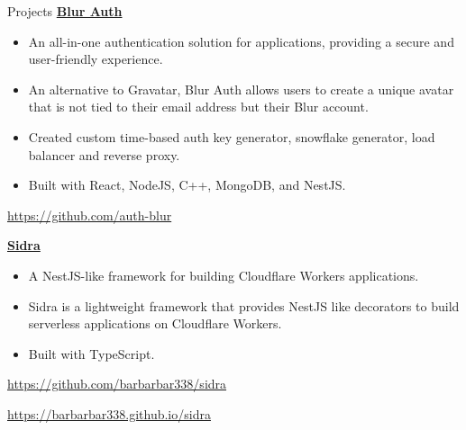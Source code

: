 \begin{rubric}{Projects}
    \entry*[2020]%
        \href{https://github.com/auth-blur}{\textbf{Blur Auth}}
        \begin{itemize}
            \item An all-in-one authentication solution for applications, providing a secure and user-friendly experience.
            \item An alternative to Gravatar, Blur Auth allows users to create a unique avatar that is not tied to their email address but their Blur account.
            \item Created custom time-based auth key generator, snowflake generator, load balancer and reverse proxy. 
            \item Built with React, NodeJS, C++, MongoDB, and NestJS.
        \end{itemize}
        \par \url{https://github.com/auth-blur}

    \entry*[2020]%
        \href{https://github.com/barbarbar338/sidra}{\textbf{Sidra}}
        \begin{itemize}
            \item A NestJS-like framework for building Cloudflare Workers applications.
            \item Sidra is a lightweight framework that provides NestJS like decorators to build serverless applications on Cloudflare Workers.
            \item Built with TypeScript.
        \end{itemize}
        \par \url{https://github.com/barbarbar338/sidra}
        \par \url{https://barbarbar338.github.io/sidra}
\end{rubric}
